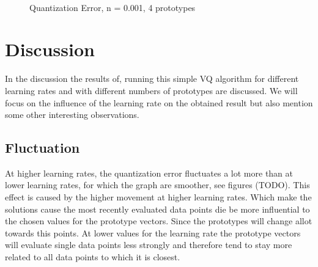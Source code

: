 \documentclass[10pt,a4paper]{article}
\begin{document}
\begin{figure}
  \centering
{} \\
  \caption{Quantization Error, n = 0.001, 4 prototypes}
  \label{fig:n0001_k4_learning}
\end{figure}

\section{Discussion}
In the discussion the results of, running this simple VQ algorithm for different learning rates and with different numbers of prototypes are discussed. We will focus on the influence of the learning rate on the obtained result but also mention some other interesting observations.

\subsection{Fluctuation}
At higher learning rates, the quantization error fluctuates a lot more than at lower learning rates, for which the graph are smoother, see figures (TODO). This effect is caused by the higher movement at higher learning rates. Which make the solutions cause the most recently evaluated data points die be more influential to the chosen values for the prototype vectors. Since the prototypes will change allot towards this points. At lower values for the learning rate the prototype vectors will evaluate single data points less strongly and therefore tend to stay more related to all data points to which it is closest.
\end{document}
